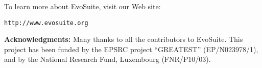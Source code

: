 \documentclass[10pt,conference]{IEEEtran}
\newcommand{\EVOSUITE}{{\sc EvoSuite}\xspace}
\begin{document}
To learn more about \EVOSUITE, visit our Web site:
\begin{center}
\texttt{http://www.evosuite.org}
\end{center}



\textbf{Acknowledgments:} Many thanks to all the contributors to \EVOSUITE.
This project has been funded by the EPSRC
project ``GREATEST'' (EP/N023978/1), and by the National Research
Fund, Luxembourg (FNR/P10/03).




\balance
\end{document}
